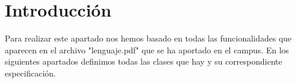 \section{Introducción}
Para realizar este apartado nos hemos basado en todas las funcionalidades que aparecen en el archivo "lenguaje.pdf"
que se ha aportado en el campus. En los siguientes apartados definimos todas las clases que hay y su correspondiente especificación.